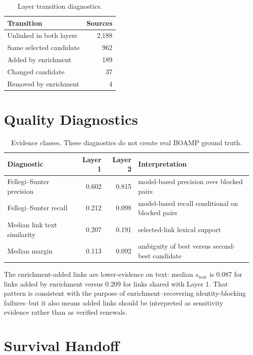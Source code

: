 \documentclass[11pt]{article}
\begin{document}
\begin{table}[h!]
\centering
\caption{Layer transition diagnostics.}
\begin{tabular}{lr}
\toprule
Transition & Sources \\
\midrule
Unlinked in both layers & 2{,}188 \\
Same selected candidate & 962 \\
Added by enrichment & 189 \\
Changed candidate & 37 \\
Removed by enrichment & 4 \\
\bottomrule
\end{tabular}
\end{table}

\section{Quality Diagnostics}

\begin{table}[h!]
\centering
\caption{Evidence classes. These diagnostics do not create real BOAMP ground truth.}
\begin{tabular}{lrrp{}}
\toprule
Diagnostic & Layer 1 & Layer 2 & Interpretation \\
\midrule
Fellegi--Sunter precision & 0.602 & 0.815 & model-based precision over blocked pairs \\
Fellegi--Sunter recall & 0.212 & 0.098 & model-based recall conditional on blocked pairs \\
Median link text similarity & 0.207 & 0.191 & selected-link lexical support \\
Median margin & 0.113 & 0.092 & ambiguity of best versus second-best candidate \\
\bottomrule
\end{tabular}
\end{table}

The enrichment-added links are lower-evidence on text: median \(s_{\mathrm{text}}\)
is 0.087 for links added by enrichment versus 0.209 for links shared with Layer
1. That pattern is consistent with the purpose of enrichment--recovering
identity-blocking failures--but it also means added links should be interpreted
as sensitivity evidence rather than as verified renewals.

\section{Survival Handoff}
\end{document}
